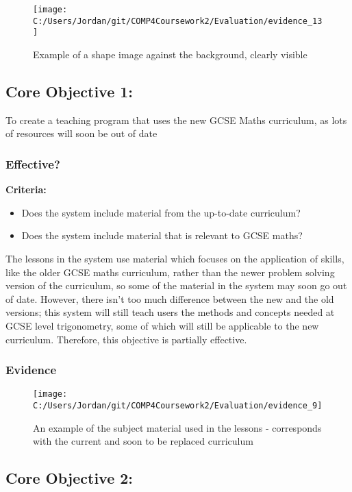 \begin{figure}[H]
	\texttt{[image: C:/Users/Jordan/git/COMP4Coursework2/Evaluation/evidence\_13]}
	\caption{Example of a shape image against the background, clearly visible}
\end{figure}

\subsection{Core Objective 1: }

To create a teaching program that uses the new GCSE Maths curriculum, as lots of resources will soon be out of date

\subsubsection{Effective?}

\textbf{Criteria: }

\begin{itemize}
	\item Does the system include material from the up-to-date curriculum?
	\item Does the system include material that is relevant to GCSE maths?
\end{itemize}

The lessons in the system use material which focuses on the application of skills, like the older GCSE maths curriculum, rather than the newer problem solving version of the curriculum, so some of the material in the system may soon go out of date. However, there isn't too much difference between the new and the old versions; this system will still teach users the methods and concepts needed at GCSE level trigonometry, some of which will still be applicable to the new curriculum. Therefore, this objective is partially effective.

\subsubsection{Evidence}

\begin{figure}[H]
	\texttt{[image: C:/Users/Jordan/git/COMP4Coursework2/Evaluation/evidence\_9]}
	\caption{An example of the subject material used in the lessons - corresponds with the current and soon to be replaced curriculum}
\end{figure}

\subsection{Core Objective 2: }

